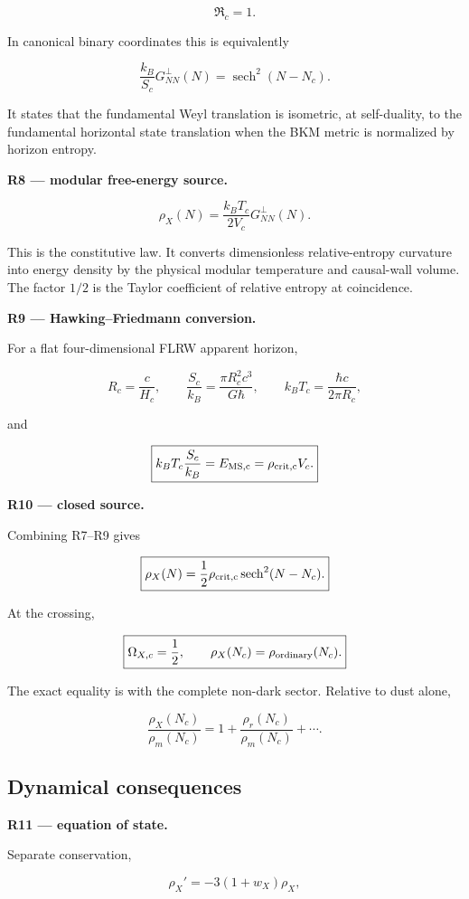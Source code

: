 \documentclass[
  11pt,
  letterpaper,
]{article}
\begin{document}
\[
\boxed{\mathfrak R_c=1.}
\]

In canonical binary coordinates this is equivalently

\[
\boxed{
\frac{k_B}{S_c}G^{\perp}_{NN}(N)=\operatorname{sech}^2(N-N_c).
}
\]

It states that the fundamental Weyl translation is isometric, at
self-duality, to the fundamental horizontal state translation when the
BKM metric is normalized by horizon entropy.

\textbf{R8 --- modular free-energy source.}

\[
\boxed{
\rho_X(N)=\frac{k_BT_c}{2V_c}G^{\perp}_{NN}(N).
}
\]

This is the constitutive law. It converts dimensionless relative-entropy
curvature into energy density by the physical modular temperature and
causal-wall volume. The factor \(1/2\) is the Taylor coefficient of
relative entropy at coincidence.

\textbf{R9 --- Hawking--Friedmann conversion.}

For a flat four-dimensional FLRW apparent horizon,

\[
\boxed{
R_c=\frac{c}{H_c},
\qquad
\frac{S_c}{k_B}=\frac{\pi R_c^2c^3}{G\hbar},
\qquad
k_BT_c=\frac{\hbar c}{2\pi R_c},
}
\]

and

\[
\boxed{
k_BT_c\frac{S_c}{k_B}
=E_{\rm MS,c}
=\rho_{\rm crit,c}V_c.
}
\]

\textbf{R10 --- closed source.}

Combining R7--R9 gives

\[
\boxed{
\rho_X(N)=\frac12\rho_{\rm crit,c}\operatorname{sech}^2(N-N_c).
}
\]

At the crossing,

\[
\boxed{
\Omega_{X,c}=\frac12,
\qquad
\rho_X(N_c)=\rho_{\rm ordinary}(N_c).
}
\]

The exact equality is with the complete non-dark sector. Relative to
dust alone,

\[
\frac{\rho_X(N_c)}{\rho_m(N_c)}
=1+\frac{\rho_r(N_c)}{\rho_m(N_c)}+\cdots.
\]

\subsection{Dynamical consequences}\label{dynamical-consequences}

\textbf{R11 --- equation of state.}

Separate conservation,

\[
\rho_X'=-3(1+w_X)\rho_X,
\]
\end{document}
